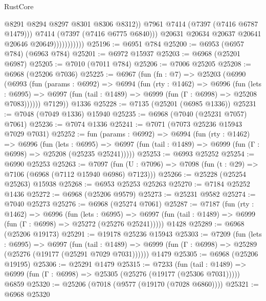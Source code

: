 \begin{lexlean}{RustCore}
\begin{coremodule}
                                  @8291
                                  @8294
                                  @8297
                                  @8301
                                  @8306
                                  @8312))
                              @7961
                              @7414
                              (@7397 (@7416 @6787 @1479)))
                            @7414
                            (@7397 (@7416 @6775 @6840)))
                          @20631
                          @20634
                          @20637
                          @20641
                          @20646
                          @20649)))))))))))
@25196 := @6951 @784
@25200 := @6953 (@6957 @784) (@6963 @784)
@25201 := @6972 @15937
@25203 := @6968 (@25201 @6987)
@25205 := @7010 (@7011 @784)
@25206 := @7006 @25205
@25208 := @6968 (@25206 @7036)
@25225 := @6967
    (fun (fn : @7) =>
    @25203
      (@6990
        (@6993
          (fun (params : @6992) =>
          @6994
            (fun (rty : @1462) =>
            @6996
              (fun (lets : @6995) =>
              @6997 (fun (tail : @1489) => @6999 (fun (Γ : @6998) => @25208 @7083))))))
        @7129))
    @1336
@25228 := @7135 (@25201 (@6985 @1336))
@25231 := @7048 (@7049 @1336) @15940
@25235 := @6968 (@7040 (@25231 @7057) @7061)
@25236 := @7074 @1336
@25241 := @7071 (@7073 @25236 @15943 @7029 @7031)
@25252 := fun (params : @6992) =>
  @6994
    (fun (rty : @1462) =>
    @6996
      (fun (lets : @6995) =>
      @6997 (fun (tail : @1489) => @6999 (fun (Γ : @6998) => @25208 (@25235 @25241)))))
@25253 := @6993 @25252
@25254 := @6990 @25253
@25263 := @7097
    (fun (U : @7096) => @7098 (fun (t : @29) => @7106 (@6968 (@7112 @15940 @6986) @7123)))
@25266 := @25228 (@25254 @25263) @15938
@25268 := @6953 @25253 @25263
@25270 := @7184 @25252 @1436
@25272 := @6968 (@25206 @9579)
@25273 := @25231 @9582
@25274 := @7040 @25273
@25276 := @6968 (@25274 @7061)
@25287 := @7187
    (fun (rty : @1462) =>
    @6996
      (fun (lets : @6995) =>
      @6997 (fun (tail : @1489) => @6999 (fun (Γ : @6998) => @25272 (@25276 @25241)))))
    @1428
@25289 := @6968 (@25206 @19173)
@25291 := @19178 @25236 @15943
@25303 := @7209
    (fun (lets : @6995) =>
    @6997
      (fun (tail : @1489) =>
      @6999 (fun (Γ : @6998) => @25289 (@25276 (@19177 (@25291 @7029 @7031))))))
    @1479
@25305 := @6968 (@25206 @19195)
@25306 := @25291 @1479
@25315 := @7233
    (fun (tail : @1489) => @6999 (fun (Γ : @6998) => @25305 (@25276 (@19177 (@25306 @7031)))))
    @6859
@25320 := @25206 (@7018 (@9577 (@19170 (@7028 @6860))))
@25321 := @6968 @25320

\end{coremodule}
\end{lexlean}
